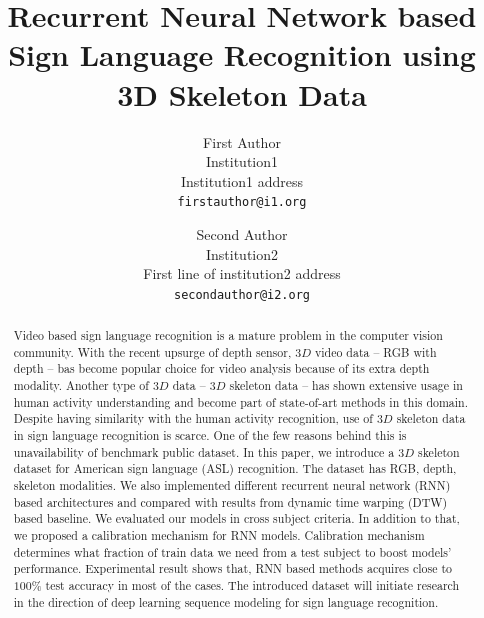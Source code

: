 \documentclass[10pt,twocolumn,letterpaper]{article}
\begin{document}
\title{Recurrent Neural Network based Sign Language Recognition using 3D Skeleton Data}

\author{First Author\\
Institution1\\
Institution1 address\\
{\tt\small firstauthor@i1.org}
\and
Second Author\\
Institution2\\
First line of institution2 address\\
{\tt\small secondauthor@i2.org}
}

\maketitle

\begin{abstract}
Video based sign language recognition is a mature problem in the computer vision community. With the recent upsurge of depth sensor, $3D$ video data -- RGB with depth -- bas become popular choice for video analysis because of its extra depth modality. Another type of $3D$ data -- $3D$ skeleton data -- has shown extensive usage in human activity understanding and become part of state-of-art methods in this domain. Despite having similarity with the human activity recognition, use of $3D$ skeleton data in sign language recognition is scarce. One of the few reasons behind this is unavailability of benchmark public dataset. In this paper, we introduce a $3D$ skeleton dataset for American sign language (ASL) recognition. The dataset has RGB, depth, skeleton modalities. We also implemented different recurrent neural network (RNN) based architectures and compared with results from dynamic time warping (DTW) based baseline. We evaluated our models in cross subject criteria. In addition to that, we proposed a calibration mechanism for RNN models. Calibration mechanism determines what fraction of train data we need from a test subject to boost models' performance. Experimental result shows that, RNN based methods acquires close to $100\%$ test accuracy in most of the cases. The introduced dataset will initiate research in the direction of deep learning sequence modeling for sign language recognition. 
\end{abstract}
\end{document}
